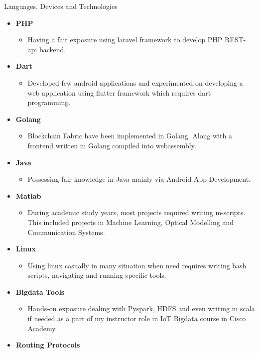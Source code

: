 \documentclass[]{mcdowellcv}
\begin{document}
\begin{cvsection}{Languages, Devices and Technologies}
\begin{cvsubsection}{}{}{}
\begin{itemize}
				
				\item \textbf{PHP}
				\begin{itemize}
					\item Having a fair exposure using laravel framework to develop PHP REST-api backend.
				\end{itemize}
				\item \textbf{Dart}
				\begin{itemize}
					\item Developed few android applications and experimented on developing a web application using flutter framework which requires dart programming.
				\end{itemize}
				\item \textbf{Golang}
				\begin{itemize}
					\item Blockchain Fabric have been implemented in Golang. Along with a frontend written in Golang compiled into webassembly.
				\end{itemize}
				\item \textbf{Java}
				\begin{itemize}
					\item Possessing fair knowledge in Java mainly via Android App Development.
				\end{itemize}
				\item \textbf{Matlab}
				\begin{itemize}
					\item During academic study years, most projects required writing m-scripts. This included projects in Machine Learning, Optical Modelling and Communication Systems.
				\end{itemize}
				\item \textbf{Linux}
				\begin{itemize}
					\item Using linux casually in many situation when need requires writing bash scripts, navigating and running specific tools. 
				\end{itemize}
				\item \textbf{Bigdata Tools}
				\begin{itemize}
					\item Hands-on exposure dealing with Pyspark, HDFS and even writing in scala if needed as a part of my instructor role in IoT Bigdata course in Cisco Academy.
				\end{itemize}
				\item \textbf{Routing Protocols}
				\begin{itemize}

\end{itemize}
\end{itemize}
\end{cvsubsection}
\end{cvsection}
\end{document}
